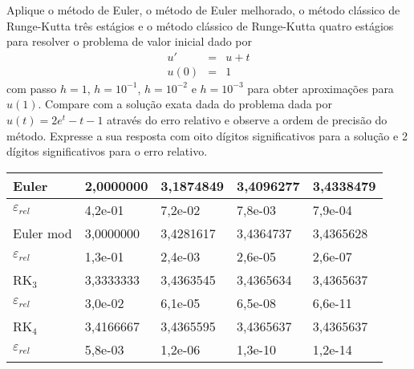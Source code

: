 \begin{exer}Aplique o método de Euler, o método de Euler melhorado, o método clássico de Runge-Kutta três estágios e o método clássico de Runge-Kutta quatro estágios para resolver o problema de valor inicial dado por
\begin{eqnarray*}
u'&=& u + t\\
u(0)&=&1
\end{eqnarray*}
com passo $h=1$, $h=10^{-1}$, $h=10^{-2}$ e $h=10^{-3}$  para obter aproximações para $u(1)$. Compare com a solução exata dada do problema dada por $u(t) =  2e^t-t-1$ através do erro relativo e observe a ordem de precisão do método. Expresse a sua resposta com oito dígitos significativos para a solução e 2 dígitos significativos para o erro relativo.
\end{exer}
\begin{resp}

\begin{center}
 \begin{tabular}{|l|l|l|l|l|}%
\hline
Euler & 2,0000000 & 3,1874849 & 3,4096277 & 3,4338479\\
\hline
$\varepsilon_{rel}$ & 4,2e-01 & 7,2e-02 & 7,8e-03 & 7,9e-04\\
\hline
Euler mod & 3,0000000 & 3,4281617 & 3,4364737 & 3,4365628\\
\hline
$\varepsilon_{rel}$ & 1,3e-01 & 2,4e-03 & 2,6e-05 & 2,6e-07\\
\hline
RK$_3$ & 3,3333333 & 3,4363545 & 3,4365634 & 3,4365637\\
\hline
$\varepsilon_{rel}$ & 3,0e-02 & 6,1e-05 & 6,5e-08 & 6,6e-11\\
\hline
RK$_4$ & 3,4166667 & 3,4365595 & 3,4365637 & 3,4365637\\
\hline
$\varepsilon_{rel}$ & 5,8e-03 & 1,2e-06 & 1,3e-10 & 1,2e-14\\
\hline
\end{tabular}
\end{center}
\end{resp}



